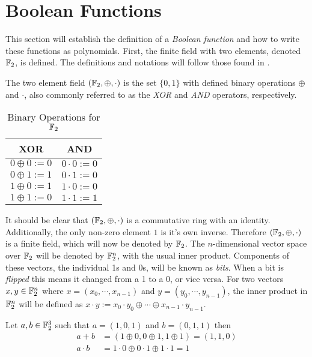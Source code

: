 \section{Boolean Functions}
\par This section will establish the definition of a {\em Boolean function}
and how to write these functions as polynomials. First, the finite field
with two elements, denoted $\mathbb{F}_2$, is defined. The definitions and
notations will follow those found in \cite{bk:cs09}.

\par The two element field $(\mathbb{F}_2,\oplus,\cdot)$ is the set $\{0,1\}$
with defined binary operations $\oplus$ and $\cdot$, also commonly referred
to as the {\em XOR} and {\em AND} operators, respectively.
\begin{table}[h!]\label{tab:GF(2)}
	\centering
	\begin{tabular}{|c|c|}
		\hline
		XOR&AND\\
		\hline
		$0\oplus0:=0$&$0\cdot0:=0$\\
		$0\oplus1:=1$&$0\cdot1:=0$\\
		$1\oplus0:=1$&$1\cdot0:=0$\\
		$1\oplus1:=0$&$1\cdot1:=1$\\
		\hline
	\end{tabular}
	\caption{Binary Operations for $\mathbb{F}_2$}
\end{table}
\par It should be clear that $(\mathbb{F}_2,\oplus,\cdot)$ is a commutative ring
with an identity. Additionally, the only non-zero element $1$ is it's own
inverse. Therefore $(\mathbb{F}_2,\oplus,\cdot)$ is a finite field, which will now
be denoted by $\mathbb{F}_2$. The $n$-dimensional vector space over $\mathbb{F}_2$ will
be denoted by $\mathbb{F}_2^n$, with the usual inner product. Components of these
vectors, the individual 1s and 0s, will be known as {\em bits}. When a bit
is {\em flipped} this means it changed from a 1 to a 0, or vice versa.
For two vectors $x,y\in\mathbb{F}_2^n$ where $x=(x_0,\cdots,x_{n-1})$ and
$y=(y_0,\cdots,y_{n-1})$, the inner product in $\mathbb{F}_2^n$ will be defined
as $x\cdot y:=\allowbreak x_0\cdot y_0 \oplus\allowbreak
\cdots \oplus\allowbreak x_{n-1}\cdot y_{n-1}$.

\begin{example}
	Let $a,b\in\mathbb{F}_2^3$ such that $a=(1,0,1)$ and $b=(0,1,1)$ then
	\begin{align*}
		a+b      &=(1\oplus0,0\oplus1,1\oplus1)=(1,1,0) \\
		a\cdot b &=1\cdot0\oplus0\cdot1\oplus1\cdot1=1
	\end{align*}
\end{example}

